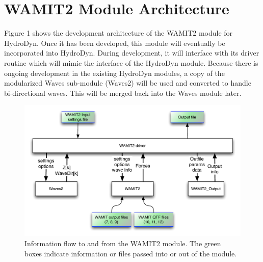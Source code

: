 \chapter{WAMIT2 Module Architecture}
\label{chap:architecture}

Figure 1 shows the development architecture of the WAMIT2 module for HydroDyn. Once it has been developed, this module will eventually be incorporated into HydroDyn. During development, it will interface with its driver routine which will mimic the interface of the HydroDyn module. Because there is ongoing development in the existing HydroDyn modules, a copy of the modularized Waves sub-module (Waves2) will be used and converted to handle bi-directional waves. This will be merged back into the Waves module later.

\begin{figure}
   \centering
      \includegraphics[width=.9\textwidth]{chaps/figures/WAMIT2_Dev.pdf}
      \caption{Information flow to and from the WAMIT2 module. The green boxes indicate information or files passed into or out of the module.\label{fig:W2Interface}}
\end{figure}


\endinput


